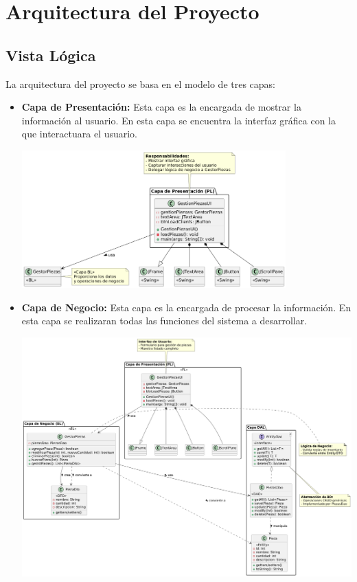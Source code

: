 \section*{Arquitectura del Proyecto}

\subsection*{Vista Lógica}
La arquitectura del proyecto se basa en el modelo de tres capas: 
\begin{itemize}
    \item \textbf{Capa de Presentación:} Esta capa es la encargada de mostrar la información al usuario. 
    En esta capa se encuentra la interfaz gráfica con la que interactuara el usuario.
    \begin{center}
        \includegraphics[width=0.8\textwidth]{imag/ImagenDiagramaUmlCapaPresentacion.png}
    \end{center}
    \item \textbf{Capa de Negocio:} Esta capa es la encargada de procesar la información. 
    En esta capa se realizaran todas las funciones del sistema a desarrollar.
    \begin{center}
        \includegraphics[width=0.8\textwidt]{imag/ImagenDiagramaUmlBussinesLayer.png}

\end{center}
\end{itemize}
